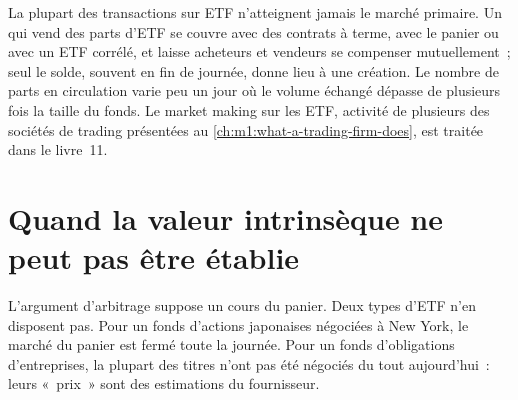 \begin{omfigure}

\label{fig:m1:exchange-traded-funds:premium}
\end{omfigure}

La plupart des transactions sur ETF n'atteignent jamais le marché primaire. Un  qui vend
des parts d'ETF se couvre avec des contrats à terme, avec le panier ou avec un ETF corrélé, et
laisse acheteurs et vendeurs se compenser mutuellement~; seul le solde, souvent en fin
de journée, donne lieu à une création. Le nombre de parts en circulation varie peu un
jour où le volume échangé dépasse de plusieurs fois la taille du fonds. Le market making sur les ETF, activité
de plusieurs des sociétés de trading présentées au \cref{ch:m1:what-a-trading-firm-does}, est
traitée dans le livre~11.

\section{Quand la valeur intrinsèque ne peut pas être établie}

L'argument d'arbitrage suppose un cours du panier. Deux types d'ETF n'en disposent
pas. Pour un fonds d'actions japonaises négociées à New York, le marché du panier est
fermé toute la journée. Pour un fonds d'obligations d'entreprises, la plupart des titres
n'ont pas été négociés du tout aujourd'hui~: leurs «~prix~» sont des estimations du fournisseur.

